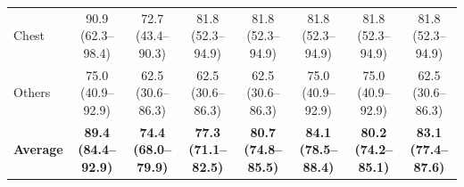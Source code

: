 \documentclass[10pt,journal,compsoc, onecolumn]{IEEEtran}
\begin{document}
\begin{table}[!htbp]
\begin{tabular}{l c @{\hskip 6pt} ccc @{\hskip 6pt} ccc}
Chest                  & 90.9 (62.3--98.4) & 72.7 (43.4--90.3) & 81.8 (52.3--94.9) & 81.8 (52.3--94.9) & 81.8 (52.3--94.9) & 81.8 (52.3--94.9) & 81.8 (52.3--94.9) \\
Others                 & 75.0 (40.9--92.9) & 62.5 (30.6--86.3) & 62.5 (30.6--86.3) & 62.5 (30.6--86.3) & 75.0 (40.9--92.9) & 75.0 (40.9--92.9) & 62.5 (30.6--86.3) \\
\midrule
\textbf{Average}       & \textbf{89.4 (84.4--92.9)} & \textbf{74.4 (68.0--79.9)} & \textbf{77.3 (71.1--82.5)} & \textbf{80.7 (74.8--85.5)} & \textbf{84.1 (78.5--88.4)} & \textbf{80.2 (74.2--85.1)} & \textbf{83.1 (77.4--87.6)} \\
\bottomrule
\end{tabular}
\end{table}


\end{document}
